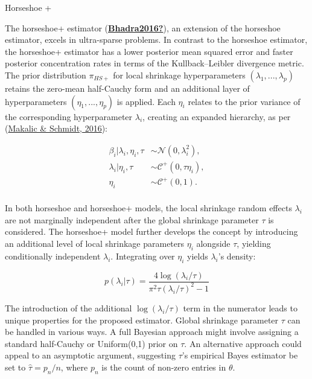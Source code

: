 \documentclass[
  11pt,
]{article}
\begin{document}
Horseshoe +

The horseshoe+ estimator
(\protect\hyperlink{ref-Bhadra2016}{\textbf{Bhadra2016?}}), an extension
of the horseshoe estimator, excels in ultra-sparse problems. In contrast
to the horseshoe estimator, the horseshoe+ estimator has a lower
posterior mean squared error and faster posterior concentration rates in
terms of the Kullback--Leibler divergence metric. The prior distribution
\(\pi_{HS+}\) for local shrinkage hyperparameters
\((\lambda_1, . . . , \lambda_p)\) retains the zero-mean half-Cauchy
form and an additional layer of hyperparameters
\((\eta_1, . . . , \eta_p)\) is applied. Each \(\eta_i\) relates to the
prior variance of the corresponding hyperparameter \(\lambda_i\),
creating an expanded hierarchy, as per
(\protect\hyperlink{ref-Makalic2016}{Makalic \& Schmidt, 2016}):

\begin{align}
\beta_i | \lambda_i, \eta_i, \tau &\sim \mathcal{N}(0, \lambda_i^2), \\
\lambda_i | \eta_i, \tau &\sim \mathcal{C}^+(0, \tau \eta_i), \\
\eta_i &\sim \mathcal{C}^+(0,1). \\
\end{align}

In both horseshoe and horseshoe+ models, the local shrinkage random
effects \(\lambda_i\) are not marginally independent after the global
shrinkage parameter \(\tau\) is considered. The horseshoe+ model further
develops the concept by introducing an additional level of local
shrinkage parameters \(\eta_i\) alongside \(\tau\), yielding
conditionally independent \(\lambda_i\). Integrating over \(\eta_i\)
yields \(\lambda_i\)'s density:

\begin{equation}
p(\lambda_i|\tau) = \frac{4 \log(\lambda_i/\tau)}{\pi^2\tau(\lambda_i/\tau)^2 -1} \tag{7}
\end{equation}

The introduction of the additional \(\log(\lambda_i/\tau)\) term in the
numerator leads to unique properties for the proposed estimator. Global
shrinkage parameter \(\tau\) can be handled in various ways. A full
Bayesian approach might involve assigning a standard half-Cauchy or
Uniform(0,1) prior on \(\tau\). An alternative approach could appeal to
an asymptotic argument, suggesting \(\tau\)'s empirical Bayes estimator
be set to \(\hat{\tau} = p_n/n\), where \(p_n\) is the count of non-zero
entries in \(\theta\).
\end{document}
